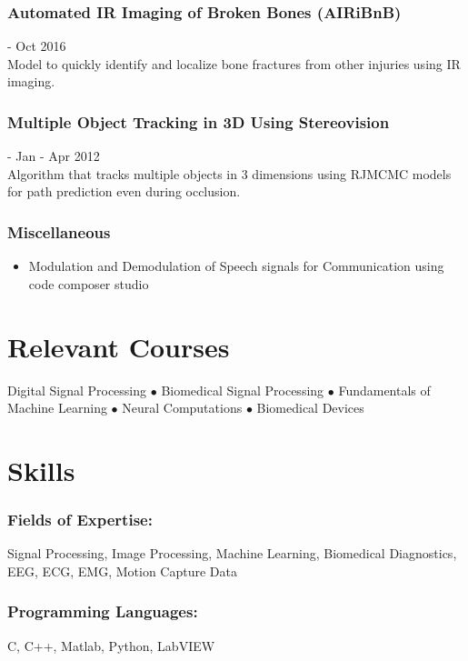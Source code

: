 \documentclass{article}
\begin{document}
 \subsubsection{Automated IR Imaging of Broken Bones (AIRiBnB)} \hfill - Oct 2016\\
Model to quickly identify and localize bone fractures from other injuries using IR imaging.\\
    
\subsubsection{Multiple Object Tracking in 3D Using Stereovision} \hfill - Jan - Apr 2012\\
Algorithm that tracks multiple objects in 3 dimensions using RJMCMC models for path prediction even during occlusion.\\
    
\subsubsection{Miscellaneous}
\begin{itemize}
    \item Modulation and Demodulation of Speech signals for Communication using code composer studio 
\end{itemize}


\section{Relevant Courses}
Digital Signal Processing $\bullet$ Biomedical Signal Processing $\bullet$ Fundamentals of Machine Learning $\bullet$ Neural Computations $\bullet$ Biomedical Devices


\section{Skills}
\subsubsection{Fields of Expertise:} 
Signal Processing, Image Processing, Machine Learning, Biomedical Diagnostics, EEG, ECG, EMG, Motion Capture Data
\subsubsection{Programming Languages:} 
C, C++, Matlab, Python, LabVIEW
\end{document}
